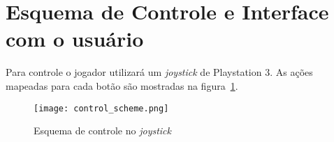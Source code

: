 \AddToShipoutPicture{\BackgroundPic}

\section*{Esquema de Controle e Interface com o usuário}

Para controle o jogador utilizará um \emph{joystick} de Playstation 3. As ações mapeadas para cada botão são mostradas na figura~\ref{control}.
 
	\begin{figure}[h]
		\centering
		\texttt{[image: control\_scheme.png]}
		\caption{Esquema de controle no \emph{joystick}}
		\label{control}
	\end{figure}

